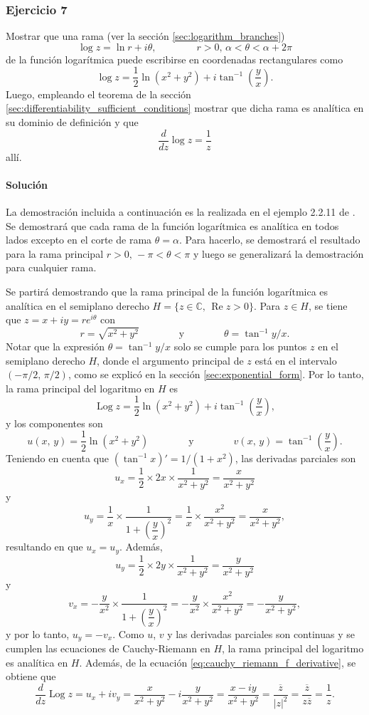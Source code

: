 \documentclass[a4paper]{report}
\renewcommand{\Re}{\operatorname{Re}}
\DeclareMathOperator{\Log}{Log}
\begin{document}
\subsubsection{Ejercicio 7}

Mostrar que una rama (ver la sección \ref{sec:logarithm_branches})
\[
 \log z=\ln r+i\theta,\qquad\qquad
 r>0,\,\alpha<\theta<\alpha+2\pi
\]
de la función logarítmica puede escribirse en coordenadas rectangulares como 
\[
 \log z=\frac{1}{2}\ln(x^2+y^2)+i\tan^{-1}\left(\frac{y}{x}\right).
\]
Luego, empleando el teorema de la sección \ref{sec:differentiability_sufficient_conditions} mostrar que dicha rama es analítica en su dominio de definición y que  
\[
 \frac{d}{dz}\log z=\frac{1}{z}
\]
allí.

\paragraph{Solución} La demostración incluida a continuación es la realizada en el ejemplo 2.2.11 de \cite{taylor2011complex}. Se demostrará que cada rama de la función logarítmica es analítica en todos lados excepto en el corte de rama \(\theta=\alpha\). Para hacerlo, se demostrará el resultado para la rama principal \(r>0,\,-\pi<\theta<\pi\) y luego se generalizará la demostración para cualquier rama.

Se partirá demostrando que la rama principal de la función logarítmica es analítica en el semiplano derecho \(H=\{z\in\mathbb{C},\,\Re z>0\}\). Para \(z\in H\), se tiene que \(z=x+iy=re^{i\theta}\) con 
\[
 r=\sqrt{x^2+y^2}
 \qquad\qquad\textrm{y}\qquad\qquad
 \theta=\tan^{-1}y/x.
\]
Notar que la expresión \(\theta=\tan^{-1}y/x\) solo se cumple para los puntos \(z\) en el semiplano derecho \(H\), donde el argumento principal de \(z\) está en el intervalo \((-\pi/2,\,\pi/2)\), como se explicó en la sección \ref{sec:exponential_form}. Por lo tanto, la rama principal del logaritmo en \(H\) es
\[
 \Log z=\frac{1}{2}\ln(x^2+y^2)+i\tan^{-1}\left(\frac{y}{x}\right),
\]
y los componentes son 
\[
 u(x,\,y)=\frac{1}{2}\ln(x^2+y^2)
 \qquad\qquad\textrm{y}\qquad\qquad
 v(x,\,y)=\tan^{-1}\left(\frac{y}{x}\right).
\]
Teniendo en cuenta que \((\tan^{-1}x)'=1/(1+x^2)\), las derivadas parciales son
\[
 u_x=\frac{1}{2}\times2x\times\frac{1}{x^2+y^2}=\frac{x}{x^2+y^2}
\]
y
\[
 u_y=\frac{1}{x}\times\dfrac{1}{1+\left(\dfrac{y}{x}\right)^2}=\frac{1}{x}\times\frac{x^2}{x^2+y^2}=\frac{x}{x^2+y^2},
\]
resultando en que \(u_x=u_y\). Además,
\[
 u_y=\frac{1}{2}\times2y\times\frac{1}{x^2+y^2}=\frac{y}{x^2+y^2}
\]
y
\[
 v_x=-\frac{y}{x^2}\times\dfrac{1}{1+\left(\dfrac{y}{x}\right)^2}=-\frac{y}{x^2}\times\frac{x^2}{x^2+y^2}=-\frac{y}{x^2+y^2},
\]
y por lo tanto, \(u_y=-v_x\). Como \(u\), \(v\) y las derivadas parciales son continuas y se cumplen las ecuaciones de Cauchy-Riemann en \(H\), la rama principal del logaritmo es analítica en \(H\). Además, de la ecuación \ref{eq:cauchy_riemann_f_derivative}, se obtiene que 
\[
 \frac{d}{dz}\Log z=u_x+iv_y=\frac{x}{x^2+y^2}-i\frac{y}{x^2+y^2}=\frac{x-iy}{x^2+y^2}=\frac{\overline{z}}{|z|^2}=\frac{\overline{z}}{z\overline{z}}=\frac{1}{z}.
\]
\end{document}
